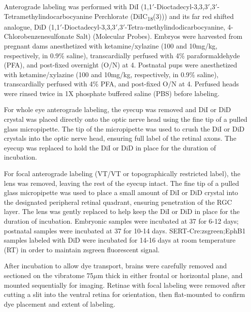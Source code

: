 Anterograde labeling was performed with DiI (1,1$'$-Dioctadecyl-3,3,3$'$,3$'$-Tetramethylindocarbocyanine Perchlorate (DiIC\textsubscript{18}(3))) and its far red shifted analogue, DiD (1,1$'$-Dioctadecyl-3,3,3$'$,3$'$-Tetra-methylindodicarbocyanine, 4-Chlorobenzenesulfonate Salt) (Molecular Probes).
Embryos were harvested from pregnant dams anesthetized with ketamine/xylazine (100 and 10mg/kg, respectively, in 0.9\% saline), transcardially perfused with 4\% paraformaldehyde (PFA), and post-fixed overnight (O/N) at 4\textcelsius.
Postnatal pups were anesthetized with ketamine/xylazine (100 and 10mg/kg, respectively, in 0.9\% saline), transcardially perfused with 4\% PFA, and post-fixed O/N at 4\textcelsius.
Perfused heads were rinsed twice in 1X phosphate buffered saline (PBS) before labeling.

For whole eye anterograde labeling, the eyecup was removed and DiI or DiD crystal was placed directly onto the optic nerve head using the fine tip of a pulled glass micropipette.
The tip of the micropipette was used to crush the DiI or DiD crystals into the optic nerve head, ensuring full label of the retinal axons.
The eyecup was replaced to hold the DiI or DiD in place for the duration of incubation.

For focal anterograde labeling (VT/VT or topographically restricted label), the lens was removed, leaving the rest of the eyecup intact.
The fine tip of a pulled glass micropipette was used to place a small amount of DiI or DiD crystal into the designated peripheral retinal quadrant, ensuring penetration of the RGC layer.
The lens was gently replaced to help keep the DiI or DiD in place for the duration of incubation.
Embryonic samples were incubated at 37\textcelsius{} for 6-12 days; postnatal samples were incubated at 37\textcelsius{} for 10-14 days.
SERT-Cre:zsgreen;EphB1 samples labeled with DiD were incubated for 14-16 days at room temperature (RT) in order to maintain zsgreen fluorescent signal.

After incubation to allow dye transport, brains were carefully removed and sectioned on the vibratome 75$\mu$m thick in either frontal or horizontal plane, and mounted sequentially for imaging.
Retinae with focal labeling were removed after cutting a slit into the ventral retina for orientation, then flat-mounted to confirm dye placement and extent of labeling.
